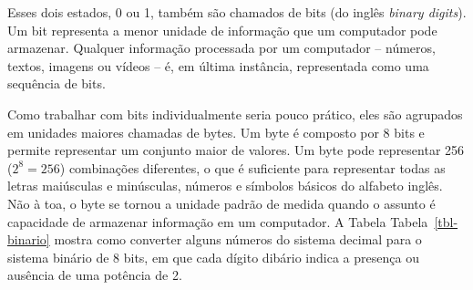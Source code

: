 \documentclass[
  brazilian,
  letterpaper,
  DIV=11,
  numbers=noendperiod]{scrreprt}
\begin{document}
Esses dois estados, 0 ou 1, também são chamados de bits (do inglês
\emph{binary digits}). Um bit representa a menor unidade de informação
que um computador pode armazenar. Qualquer informação processada por um
computador -- números, textos, imagens ou vídeos -- é, em última
instância, representada como uma sequência de bits.

Como trabalhar com bits individualmente seria pouco prático, eles são
agrupados em unidades maiores chamadas de bytes. Um byte é composto por
8 bits e permite representar um conjunto maior de valores. Um byte pode
representar 256 (\(2^8 = 256\)) combinações diferentes, o que é
suficiente para representar todas as letras maiúsculas e minúsculas,
números e símbolos básicos do alfabeto inglês. Não à toa, o byte se
tornou a unidade padrão de medida quando o assunto é capacidade de
armazenar informação em um computador. A Tabela Tabela~\ref{tbl-binario}
mostra como converter alguns números do sistema decimal para o sistema
binário de 8 bits, em que cada dígito dibário indica a presença ou
ausência de uma potência de 2.
\end{document}
